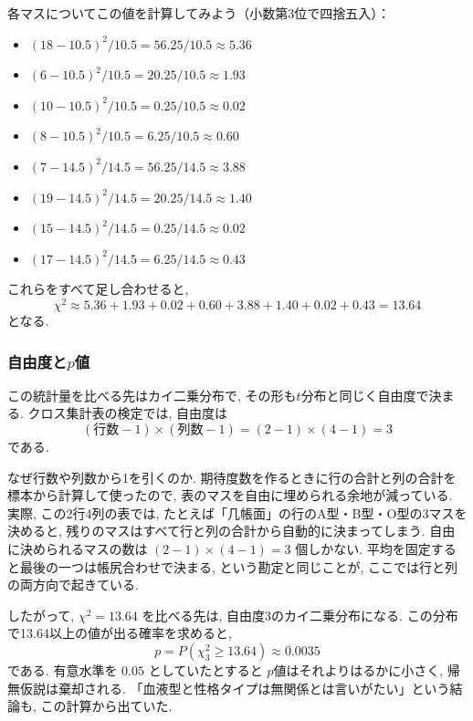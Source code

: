     各マスについてこの値を計算してみよう（小数第3位で四捨五入）：
    \begin{itemize}
      \item $(18 - 10.5)^2 / 10.5 = 56.25 / 10.5 \approx 5.36$
      \item $(6 - 10.5)^2 / 10.5 = 20.25 / 10.5 \approx 1.93$
      \item $(10 - 10.5)^2 / 10.5 = 0.25 / 10.5 \approx 0.02$
      \item $(8 - 10.5)^2 / 10.5 = 6.25 / 10.5 \approx 0.60$
      \item $(7 - 14.5)^2 / 14.5 = 56.25 / 14.5 \approx 3.88$
      \item $(19 - 14.5)^2 / 14.5 = 20.25 / 14.5 \approx 1.40$
      \item $(15 - 14.5)^2 / 14.5 = 0.25 / 14.5 \approx 0.02$
      \item $(17 - 14.5)^2 / 14.5 = 6.25 / 14.5 \approx 0.43$
    \end{itemize}
    これらをすべて足し合わせると,
    \[
    \chi^2 \approx 5.36 + 1.93 + 0.02 + 0.60 + 3.88 + 1.40 + 0.02 + 0.43 = 13.64
    \]
    となる.

    \subsubsection*{自由度と\texorpdfstring{$p$}{p}値}

    この統計量を比べる先はカイ二乗分布で, その形も$t$分布と同じく自由度で決まる.
    クロス集計表の検定では, 自由度は
    \[
    (\text{行数} - 1) \times (\text{列数} - 1) = (2 - 1) \times (4 - 1) = 3
    \]
    である.

    なぜ行数や列数から1を引くのか.
    期待度数を作るときに行の合計と列の合計を標本から計算して使ったので, 表のマスを自由に埋められる余地が減っている.
    実際, この2行4列の表では, たとえば「几帳面」の行のA型・B型・O型の3マスを決めると, 残りのマスはすべて行と列の合計から自動的に決まってしまう.
    自由に決められるマスの数は $(2-1) \times (4-1) = 3$ 個しかない.
    平均を固定すると最後の一つは帳尻合わせで決まる, という勘定と同じことが, ここでは行と列の両方向で起きている.

    したがって, $\chi^2 = 13.64$ を比べる先は, 自由度3のカイ二乗分布になる.
    この分布で13.64以上の値が出る確率を求めると,
    \[
    p = P(\chi^2_3 \geq 13.64) \approx 0.0035
    \]
    である.
    有意水準を $0.05$ としていたとすると $p$値はそれよりはるかに小さく, 帰無仮説は棄却される.
    「血液型と性格タイプは無関係とは言いがたい」という結論も, この計算から出ていた.

